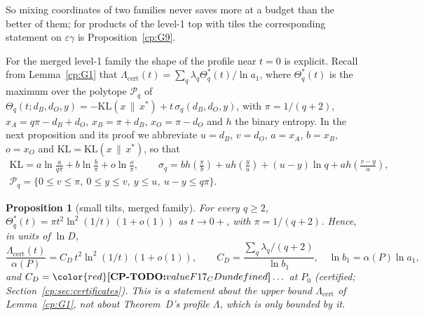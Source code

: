 \documentclass[11pt]{article}
\makeatletter
\newtheorem{proposition}[theorem]{Proposition}
\theoremstyle{definition}
\theoremstyle{remark}
\DeclareRobustCommand{\CPTODO}[1]{{\color{red}\textbf{[CP-TODO:} #1\textbf{]}}}
\providecommand{\eps}{\varepsilon}
\newcommand{\Hb}{h}                           %
\newcommand{\Lam}{\Lambda}                    %
\newcommand{\Lamcert}{\Lambda_{\mathrm{cert}}}%
\newcommand{\ThmD}{Theorem~D}                               %
\newcommand{\Pzero}{P_0}                      %
\newcommand{\KL}{\mathrm{KL}}                        %
\newcommand{\Polq}{\mathcal P}                       %
\newcommand{\cpv}[1]{\ifcsname cpv@#1\endcsname\csname cpv@#1\endcsname\else\CPTODO{value #1 undefined}\fi}
\makeatother
\begin{document}
So mixing coordinates of two families never saves more at a budget than the better of them; for products of the level-1 top with tiles the corresponding statement on $\eps\gamma$ is Proposition~\ref{cp:G9}.

For the merged level-1 family the shape of the profile near $t=0$ is explicit. Recall from Lemma~\ref{cp:G1} that $\Lamcert(t)=\sum_q\lambda_q\Theta^*_q(t)/\ln a_1$, where $\Theta^*_q(t)$ is the maximum over the polytope $\Polq_q$ of $\Theta_q(t;d_B,d_O,y)=-\KL(x\,\|\,x^*)+t\,\sigma_q(d_B,d_O,y)$, with $\pi=1/(q+2)$, $x_A=q\pi-d_B+d_O$, $x_B=\pi+d_B$, $x_O=\pi-d_O$ and $\Hb$ the binary entropy. In the next proposition and its proof we abbreviate $u=d_B$, $v=d_O$, $a=x_A$, $b=x_B$, $o=x_O$ and $\KL=\KL(x\,\|\,x^*)$, so that
\begin{gather*}
\KL=a\ln\tfrac a{q\pi}+b\ln\tfrac b\pi+o\ln\tfrac o\pi,\qquad\sigma_q=b\Hb(\tfrac\pi b)+u\Hb(\tfrac yu)+(u-y)\ln q+a\Hb(\tfrac{v-y}a),\\
\Polq_q=\{0\le v\le\pi,\ 0\le y\le v,\ y\le u,\ u-y\le q\pi\}.
\end{gather*}

\begin{proposition}[small tilts, merged family]\label{cp:F17}
For every $q\ge2$, $\Theta^*_q(t)=\pi t^2\ln^2(1/t)\,(1+o(1))$ as $t\to0+$, with $\pi=1/(q+2)$. Hence, in units of $\ln D$,
\[
\frac{\Lamcert(t)}{\alpha(P)}=C_D\,t^2\ln^2(1/t)\,(1+o(1)),\qquad C_D=\frac{\sum_q\lambda_q/(q+2)}{\ln b_1},\quad\ln b_1=\alpha(P)\ln a_1,
\]
and $C_D=\cpv{F17_CD}\ldots$ at $\Pzero$ (certified; Section~\ref{cp:sec:certificates}). This is a statement about the upper bound $\Lamcert$ of Lemma~\ref{cp:G1}, not about \ThmD's profile $\Lam$, which is only bounded by it.
\end{proposition}
\end{document}
